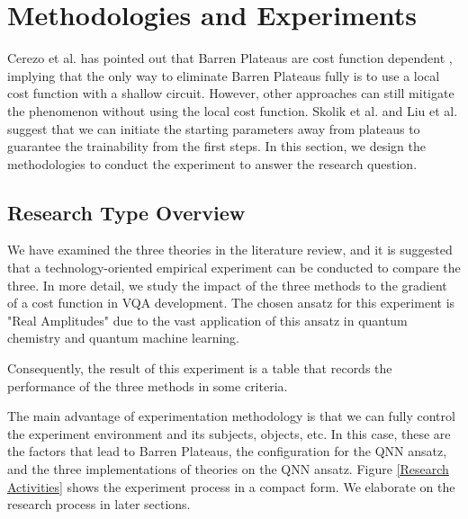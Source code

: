 \section{Methodologies and Experiments}
Cerezo et al. has pointed out that Barren Plateaus are cost function dependent \cite{cerezoCostFunctionDependent2021}, implying that the only way to eliminate Barren Plateaus fully is to use a local cost function with a shallow circuit.
However, other approaches can still mitigate the phenomenon without using the local cost function.
Skolik et al. and Liu et al. \cite{skolikLayerwiseLearningQuantum2021, liuParameterInitializationMethod2021} suggest that we can initiate the starting parameters away from plateaus to guarantee the trainability from the first steps.
In this section, we design the methodologies to conduct the experiment to answer the research question.

\subsection{Research Type Overview}
We have examined the three theories \cite{cerezoCostFunctionDependent2021, liuParameterInitializationMethod2021, skolikLayerwiseLearningQuantum2021} in the literature review, and it is suggested that a technology-oriented empirical experiment can be conducted to compare the three. 
In more detail, we study the impact of the three methods to the gradient of a cost function in VQA development. 
The chosen ansatz for this experiment is "Real Amplitudes" due to the vast application of this ansatz in quantum chemistry and quantum machine learning.


Consequently, the result of this experiment is a table that records the performance of the three methods in some criteria.

The main advantage of experimentation methodology is that we can fully control the experiment environment and its subjects, objects, etc.
In this case, these are the factors that lead to Barren Plateaus, the configuration for the QNN ansatz, and the three implementations of theories on the QNN ansatz.
Figure \ref{Research Activities} shows the experiment process in a compact form.
We elaborate on the research process in later sections.

